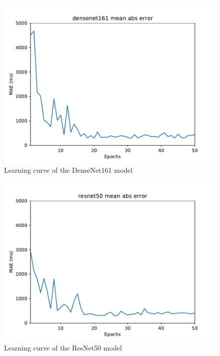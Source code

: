 \documentclass[10pt,twocolumn,letterpaper]{article}
\begin{document}
\begin{figure}[h]
    \begin{center}
        \includegraphics[width=0.8\linewidth]{images/densenet161.pdf}
    \end{center}
    \caption{Learning curve of the DenseNet161 model}
    \label{fig:densenet161}
\end{figure}

\begin{figure}[h]
    \begin{center}
        \includegraphics[width=0.8\linewidth]{images/resnet50.pdf}
    \end{center}
    \caption{Learning curve of the ResNet50 model}
    \label{fig:resnet50}
\end{figure}
\end{document}
